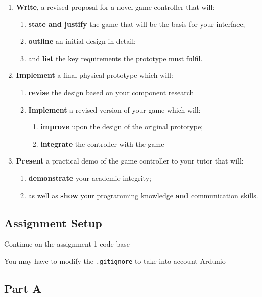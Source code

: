 \documentclass{../fal_assignment}
\begin{document}
\begin{enumerate}[label=(\Alph*)]
    \item \textbf{Write}, a revised proposal for a novel game controller that will:
    	\begin{enumerate}[label=\roman*.]
    		\item \textbf{state and justify} the game that will be the basis for your interface;
		\item \textbf{outline} an initial design in detail;
		\item and \textbf{list} the key requirements the prototype must fulfil.
	\end{enumerate}
    \item \textbf{Implement} a final physical prototype which will:
    	\begin{enumerate}[label=\roman*.]
		\item \textbf{revise} the design based on your component research
		    \item \textbf{Implement} a revised version of your game which will:
		\begin{enumerate}[label=\roman*.]
			\item \textbf{improve} upon the design of the original prototype;
			\item \textbf{integrate} the controller with the game
		\end{enumerate}
	\end{enumerate}
    \item \textbf{Present} a practical demo of the game controller to your tutor that will:
    	\begin{enumerate}[label=\roman*.]
    		\item \textbf{demonstrate} your academic integrity;
    		\item as well as \textbf{show} your programming knowledge \textbf{and} communication skills.
	\end{enumerate}
\end{enumerate}

\subsection*{Assignment Setup}

Continue on the assignment 1 code base 

You may have to modify the \texttt{.gitignore} to take into account Ardunio 

\subsection*{Part A}
\end{document}
